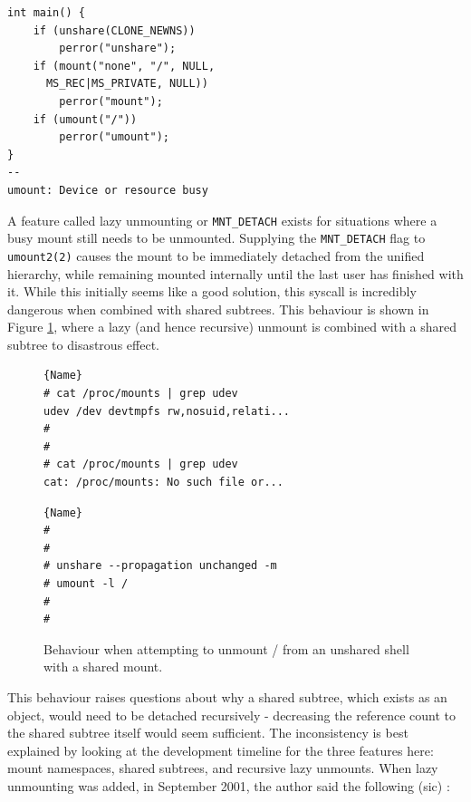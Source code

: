 \documentclass[sigplan]{acmart}
\begin{document}
\begin{lstlisting}[float,label={lst:unshare-umount}]
int main() {
	if (unshare(CLONE_NEWNS))
		perror("unshare");
	if (mount("none", "/", NULL,
	  MS_REC|MS_PRIVATE, NULL))
		perror("mount");
	if (umount("/"))
		perror("umount");
}
--
umount: Device or resource busy
\end{lstlisting}

A feature called lazy unmounting or \texttt{MNT\_DETACH} exists for situations where a busy mount still needs to be unmounted. Supplying the \texttt{MNT\_DETACH} flag to \texttt{umount2(2)} causes the mount to be immediately detached from the unified hierarchy, while remaining mounted internally until the last user has finished with it. While this initially seems like a good solution, this syscall is incredibly dangerous when combined with shared subtrees. This behaviour is shown in Figure \ref{fig:unshare-umount-lazy}, where a lazy (and hence recursive) unmount is combined with a shared subtree to disastrous effect.

\begin{figure}
\begin{minipage}{.45\textwidth}

\begin{lstlisting}[frame=tlrb,showlines=true]{Name}
# cat /proc/mounts | grep udev
udev /dev devtmpfs rw,nosuid,relati...
#
#
# cat /proc/mounts | grep udev
cat: /proc/mounts: No such file or...
\end{lstlisting}
\end{minipage}\hfill
\begin{minipage}{.45\textwidth}

\begin{lstlisting}[frame=tlrb]{Name}
#
#
# unshare --propagation unchanged -m
# umount -l /
#
#
\end{lstlisting}

\end{minipage}

\caption{Behaviour when attempting to unmount / from an unshared shell with a shared mount.}
\label{fig:unshare-umount-lazy}
\end{figure}

This behaviour raises questions about why a shared subtree, which exists as an object, would need to be detached recursively - decreasing the reference count to the shared subtree itself would seem sufficient. The inconsistency is best explained by looking at the development timeline for the three features here: mount namespaces, shared subtrees, and recursive lazy unmounts. When lazy unmounting was added, in September 2001, the author said the following (sic) \citep{viro_patch_2001}:
\end{document}
